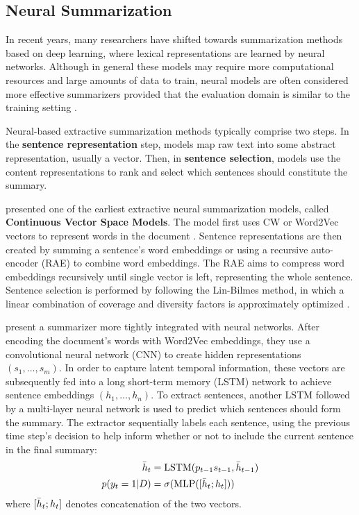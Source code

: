 \subsection{Neural Summarization}\label{sec:neural}
In recent years, many researchers have shifted towards summarization methods based on deep learning, where lexical representations are learned by neural networks. Although in general these models may require more computational resources and large amounts of data to train, neural models are often considered more effective summarizers provided that the evaluation domain is similar to the training setting \parencite{ext5_summarunner}.

Neural-based extractive summarization methods typically comprise two steps. In the \textbf{sentence representation} step, models map raw text into some abstract representation, usually a vector. Then, in \textbf{sentence selection}, models use the content representations to rank and select which sentences should constitute the summary.

\cite{kageback-etal-2014-extractive} presented one of the earliest extractive neural summarization models, called \textbf{Continuous Vector Space Models}. The model first uses CW or Word2Vec vectors to represent words in the document \parencite{word2vec, cw}. Sentence representations are then created by summing a sentence's word embeddings or using a recursive auto-encoder (RAE) to combine word embeddings. The RAE aims to compress word embeddings recursively until single vector is left, representing the whole sentence. Sentence selection is performed by following the Lin-Bilmes method, in which a linear combination of coverage and diversity factors is approximately optimized \parencite{lin-bilmes-2011-class}.

\cite{cheng-lapata-2016-neural} present a summarizer more tightly integrated with neural networks. After encoding the document's words with Word2Vec embeddings, they use a convolutional neural network (CNN) to create hidden representations $(s_1,\dots,s_m)$. In order to capture latent temporal information, these vectors are subsequently fed into a long short-term memory (LSTM) network to achieve sentence embeddings $(h_1,\dots,h_n)$. To extract sentences, another LSTM followed by a multi-layer neural network is used to predict which sentences should form the summary. The extractor sequentially labels each sentence, using the previous time step's decision to help inform whether or not to include the current sentence in the final summary:
\begin{align}
    \Bar{h}_t &= \mathrm{LSTM}(p_{t-1}s_{t-1}, \Bar{h}_{t-1})\\
    p(y_t = 1 | D) &= \sigma(\mathrm{MLP}([\Bar{h}_{t}; h_t]))
\end{align}
where $[\Bar{h}_{t}; h_t]$ denotes concatenation of the two vectors.

